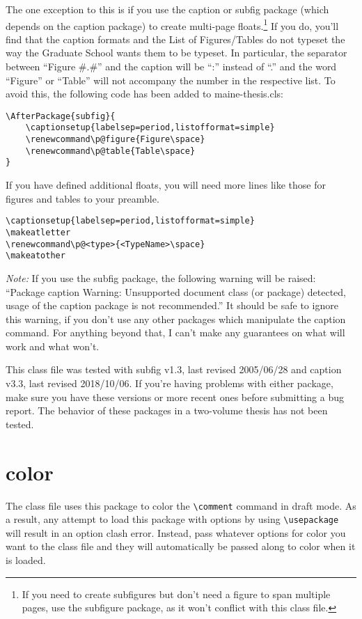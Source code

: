 The one exception to this is if you use the caption or subfig package (which depends on the caption package) to create multi-page floats.\footnote{If you need to create subfigures but don't need a figure to span multiple pages, use the subfigure package, as it won't conflict with this class file.} If you do, you'll find that the caption formats and the List of Figures/Tables do not typeset the way the Graduate School wants them to be typeset.  In particular, the separator between ``Figure \#.\#'' and the caption will be ``:\space'' instead of ``.\space'' and the word ``Figure'' or ``Table'' will not accompany the number in the respective list.  To avoid this, the following code has been added to maine-thesis.cls:
\begin{verbatim}
\AfterPackage{subfig}{
	\captionsetup{labelsep=period,listofformat=simple}
	\renewcommand\p@figure{Figure\space}
	\renewcommand\p@table{Table\space}
}
\end{verbatim}
If you have defined additional floats, you will need more lines like those for figures and tables to your preamble.
\begin{verbatim}
\captionsetup{labelsep=period,listofformat=simple}
\makeatletter
\renewcommand\p@<type>{<TypeName>\space}
\makeatother
\end{verbatim}

\emph{Note:} If you use the subfig package, the following warning will be raised: ``Package caption Warning: Unsupported document class (or package) detected, usage of the caption package is not recommended.''  It should be safe to ignore this warning, if you don't use any other packages which manipulate the caption command.  For anything beyond that, I can't make any guarantees on what will work and what won't.

This class file was tested with subfig v1.3, last revised 2005/06/28 and caption v3.3, last revised 2018/10/06.  If you're having problems with either package, make sure you have these versions or more recent ones before submitting a bug report.  The behavior of these packages in a two-volume thesis has not been tested.

\section{color}
The class file uses this package to color the \verb=\comment= command in draft mode.  As a result, any attempt to load this package with options by using \verb=\usepackage= will result in an option clash error.  Instead, pass whatever options for color you want to the class file and they will automatically be passed along to color when it is loaded.

